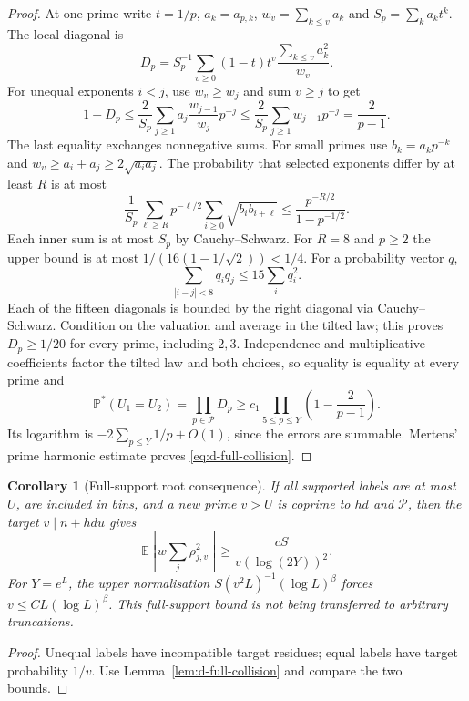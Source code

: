 \documentclass[11pt]{article}
\newtheorem{corollary}[theorem]{Corollary}
\theoremstyle{definition}
\newcommand{\E}{\mathbb E}
\newcommand{\Prob}{\mathbb P}
\theoremstyle{remark}
\numberwithin{equation}{section}
\begin{document}
\begin{proof}
At one prime write $t=1/p$, $a_k=a_{p,k}$, $w_v=\sum_{k\le v}a_k$ and $S_p=\sum_k a_kt^k$.
The local diagonal is
\begin{equation}\label{eq:d-local-diagonal}
 D_p=S_p^{-1}\sum_{v\ge0}(1-t)t^v\frac{\sum_{k\le v}a_k^2}{w_v}.
\end{equation}
For unequal exponents $i<j$, use $w_v\ge w_j$ and sum $v\ge j$ to get
\begin{equation}\label{eq:d-off-diagonal}
 1-D_p\le\frac2{S_p}\sum_{j\ge1}a_j\frac{w_{j-1}}{w_j}p^{-j}
 \le\frac2{S_p}\sum_{j\ge1}w_{j-1}p^{-j}=\frac2{p-1}.
\end{equation}
The last equality exchanges nonnegative sums. For small primes use $b_k=a_kp^{-k}$ and
$w_v\ge a_i+a_j\ge2\sqrt{a_ia_j}$. The probability that selected exponents differ by at least $R$ is at most
\begin{equation}\label{eq:d-exponent-gap}
 \frac1{S_p}\sum_{\ell\ge R}p^{-\ell/2}\sum_{i\ge0}\sqrt{b_ib_{i+\ell}}
 \le\frac{p^{-R/2}}{1-p^{-1/2}}.
\end{equation}
Each inner sum is at most $S_p$ by Cauchy--Schwarz. For $R=8$ and $p\ge2$ the upper bound is at most
$1/(16(1-1/\sqrt2))<1/4$. For a probability vector $q$,
\begin{equation}\label{eq:d-near-diagonals}
 \sum_{|i-j|<8}q_iq_j\le15\sum_iq_i^2.
\end{equation}
Each of the fifteen diagonals is bounded by the right diagonal via Cauchy--Schwarz.
Condition on the valuation and average in the tilted law; this proves $D_p\ge1/20$ for every prime,
including $2,3$. Independence and multiplicative coefficients factor the tilted law and both choices,
so equality is equality at every prime and
\begin{equation}\label{eq:d-collision-product}
 \Prob^*(U_1=U_2)=\prod_{p\in\mathcal P}D_p
 \ge c_1\prod_{5\le p\le Y}\left(1-\frac2{p-1}\right).
\end{equation}
Its logarithm is $-2\sum_{p\le Y}1/p+O(1)$, since the errors are summable.
Mertens' prime harmonic estimate proves \eqref{eq:d-full-collision}.
\end{proof}
\begin{corollary}[Full-support root consequence]\label{cor:d-full-root}
If all supported labels are at most $U$, are included in bins, and a new prime $v>U$ is coprime to
$hd$ and $\mathcal P$, then the target $v\mid n+hdu$ gives
\begin{equation}\label{eq:d-full-root}
 \E[w\sum_j\rho_{j,v}^2]\ge\frac{cS}{v(\log(2Y))^2}.
\end{equation}
For $Y=e^L$, the upper normalisation $S(v^2L)^{-1}(\log L)^\beta$ forces
$v\le CL(\log L)^\beta$. This full-support bound is not being transferred to arbitrary truncations.
\end{corollary}
\begin{proof}
Unequal labels have incompatible target residues; equal labels have target probability $1/v$.
Use Lemma~\ref{lem:d-full-collision} and compare the two bounds.
\end{proof}
\end{document}
